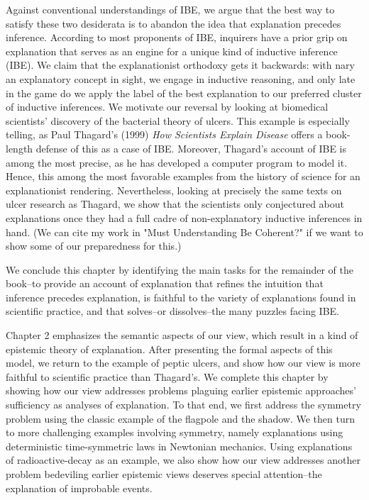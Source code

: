 \documentclass{article}[11pt]
\begin{document}
Against conventional understandings of IBE, we argue that the best way to satisfy these two desiderata is to abandon the idea that explanation precedes inference. According to most proponents of IBE, inquirers have a prior grip on explanation that serves as an engine for a unique kind of inductive inference (IBE). We claim that the explanationist orthodoxy gets it backwards: with nary an explanatory concept in sight, we engage in inductive reasoning, and only late in the game do we apply the label of the best explanation to our preferred cluster of inductive inferences. We motivate our reversal by looking at biomedical scientists' discovery of the bacterial theory of ulcers. This example is especially telling, as Paul Thagard's (1999) \textit{How Scientists Explain Disease} offers a book-length defense of this as a case of IBE. Moreover, Thagard's account of IBE is among the most precise, as he has developed a computer program to model it. Hence, this among the most favorable examples from the history of science for an explanationist rendering. Nevertheless, looking at precisely the same texts on ulcer research as Thagard, we show that the scientists only conjectured about explanations once they had a full cadre of non-explanatory inductive inferences in hand. (We can cite my work in "Must Understanding Be Coherent?" if we want to show some of our preparedness for this.)

We conclude this chapter by identifying the main tasks for the remainder of the book--to provide an account of explanation that refines the intuition that inference precedes explanation, is faithful to the variety of explanations found in scientific practice, and that solves--or dissolves--the many puzzles facing IBE. 

Chapter 2 emphasizes the semantic aspects of our view, which result in a kind of epistemic theory of explanation. After presenting the formal aspects of this model, we return to the example of peptic ulcers, and show how our view is more faithful to scientific practice than Thagard's. We complete this chapter by showing how our view addresses problems plaguing earlier epistemic approaches' sufficiency as analyses of explanation. To that end, we first address the symmetry problem using the classic example of the flagpole and the shadow. We then turn to more challenging examples involving symmetry, namely explanations using deterministic time-symmetric laws in Newtonian mechanics. Using explanations of radioactive-decay as an example, we also show how our view addresses another problem bedeviling earlier epistemic views deserves special attention--the explanation of improbable events.
\end{document}
